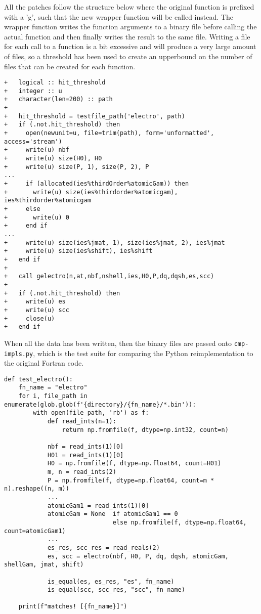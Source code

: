 All the patches follow the structure below where the original function is prefixed with a 'g', such that the new wrapper function will be called instead. The wrapper function writes the function arguments to a binary file before calling the actual function and then finally writes the result to the same file.
Writing a file for each call to a function is a bit excessive and will produce a very large amount of files, so a threshold has been used to create an upperbound on the number of files that can be created for each function.

\begin{verbatim}
+   logical :: hit_threshold
+   integer :: u
+   character(len=200) :: path
+
+   hit_threshold = testfile_path('electro', path)
+   if (.not.hit_threshold) then
+     open(newunit=u, file=trim(path), form='unformatted', access='stream')
+     write(u) nbf
+     write(u) size(H0), H0
+     write(u) size(P, 1), size(P, 2), P
...
+     if (allocated(ies%thirdOrder%atomicGam)) then
+       write(u) size(ies%thirdorder%atomicgam), ies%thirdorder%atomicgam
+     else
+       write(u) 0
+     end if
...
+     write(u) size(ies%jmat, 1), size(ies%jmat, 2), ies%jmat
+     write(u) size(ies%shift), ies%shift
+   end if
+
+   call gelectro(n,at,nbf,nshell,ies,H0,P,dq,dqsh,es,scc)
+
+   if (.not.hit_threshold) then
+     write(u) es
+     write(u) scc
+     close(u)
+   end if
\end{verbatim}

When all the data has been written, then the binary files are passed onto \verb|cmp-impls.py|, which is the test suite for comparing the Python reimplementation to the original Fortran code. 

\begin{verbatim}
def test_electro():
    fn_name = "electro"
    for i, file_path in enumerate(glob.glob(f'{directory}/{fn_name}/*.bin')):
        with open(file_path, 'rb') as f:
            def read_ints(n=1):
                return np.fromfile(f, dtype=np.int32, count=n)

            nbf = read_ints(1)[0]
            H01 = read_ints(1)[0]
            H0 = np.fromfile(f, dtype=np.float64, count=H01)
            m, n = read_ints(2)
            P = np.fromfile(f, dtype=np.float64, count=m * n).reshape((n, m))
            ...
            atomicGam1 = read_ints(1)[0]
            atomicGam = None  if atomicGam1 == 0
                              else np.fromfile(f, dtype=np.float64, count=atomicGam1)
            ...
            es_res, scc_res = read_reals(2)
            es, scc = electro(nbf, H0, P, dq, dqsh, atomicGam, shellGam, jmat, shift)

            is_equal(es, es_res, "es", fn_name)
            is_equal(scc, scc_res, "scc", fn_name)

    print(f"matches! [{fn_name}]")
\end{verbatim}
